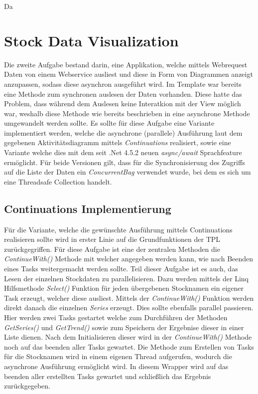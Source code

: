 \documentclass[a4paper,ngerman]{scrartcl}
\begin{document}
Da 

\section{Stock Data Visualization}

Die zweite Aufgabe bestand darin, eine Applikation, welche mittels Webrequest Daten von einem Webservice ausliest und diese in Form  von Diagrammen anzeigt anzupassen, sodass diese asynchron ausgeführt wird. Im Template war bereits eine Methode zum synchronen auslesen der Daten vorhanden. Diese hatte das Problem, dass während dem Auslesen keine Interatkion mit der View möglich war, weshalb diese Methode wie bereits beschrieben in eine asynchrone Methode umgewandelt werden sollte. Es sollte für diese Aufgabe eine Variante implementiert werden, welche die asynchrone (parallele) Ausführung laut dem gegebenen Aktivitätsdiagramm mittels \textit{Continuations} realisiert, sowie eine Variante welche dies mit dem seit .Net 4.5.2 neuen \textit{async/await} Sprachfeature ermöglicht. Für beide Versionen gilt, dass für die Synchronisierung des Zugriffs auf die Liste der Daten ein \textit{ConcurrentBag} verwendet wurde, bei dem es sich um eine Threadsafe Collection handelt.

\subsection{Continuations Implementierung}
Für die Variante, welche die gewünschte Ausführung mittels Continuations realisieren sollte wird in erster Linie auf die Grundfunktionen der TPL zurückgegriffen. Für diese Aufgabe ist eine der zentralen Methoden die \textit{ContinueWith()} Methode mit welcher angegeben werden kann, wie nach Beenden eines Tasks weitergemacht werden sollte. Teil dieser Aufgabe ist es auch, das Lesen der einzelnen Stockdaten zu parallelisieren. Dazu werden mittels der Linq Hilfsmethode \textit{Select()} Funktion für jeden übergebenen Stocknamen ein eigener Task erzeugt, welcher diese ausliest. Mittels der \textit{ContinueWith()} Funktion werden direkt danach die einzelnen \textit{Series} erzeugt. Dies sollte ebenfalls parallel passieren. Hier werden zwei Tasks gestartet welche zum Durchführen der Methoden \textit{GetSeries()} und \textit{GetTrend()} sowie zum Speichern der Ergebnise dieser in einer Liste dienen. Nach dem Initialisieren dieser wird in der \textit{ContinueWith()} Methode noch auf das beenden aller Tasks gewartet. Die Methode zum Erstellen von Tasks für die Stocknamen wird in einem eigenen Thread aufgerufen, wodurch die asynchrone Ausführung ermöglicht wird. In diesem Wrapper wird auf das beenden aller erstellten Tasks gewartet und schließlich das Ergebnis zurückgegeben. 
\end{document}
